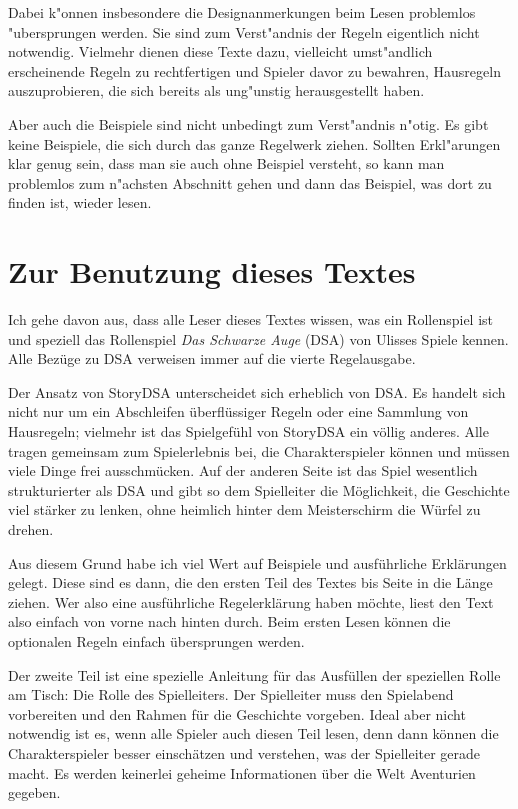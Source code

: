 Dabei k"onnen insbesondere die Designanmerkungen beim Lesen problemlos "ubersprungen werden. Sie sind zum Verst"andnis der Regeln eigentlich nicht notwendig. Vielmehr dienen diese Texte dazu, vielleicht umst"andlich erscheinende Regeln zu rechtfertigen und Spieler davor zu bewahren, Hausregeln auszuprobieren, die sich bereits als ung"unstig herausgestellt haben.

Aber auch die Beispiele sind nicht unbedingt zum Verst"andnis n"otig. Es gibt keine Beispiele, die sich durch das ganze Regelwerk ziehen. Sollten Erkl"arungen klar genug sein, dass man sie auch ohne Beispiel versteht, so kann man problemlos zum n"achsten Abschnitt gehen und dann das Beispiel, was dort zu finden ist, wieder lesen.


\section{Zur Benutzung dieses Textes}
Ich gehe davon aus, dass alle Leser dieses Textes wissen, was ein Rollenspiel ist und speziell das Rollenspiel \emph{Das Schwarze Auge} (DSA) von Ulisses Spiele kennen. Alle Bezüge zu DSA verweisen immer auf die vierte Regelausgabe.

Der Ansatz von StoryDSA unterscheidet sich erheblich von DSA. Es handelt sich nicht nur um ein Abschleifen überflüssiger Regeln oder eine Sammlung von Hausregeln; vielmehr ist das Spielgefühl von StoryDSA ein völlig anderes. Alle tragen gemeinsam zum Spielerlebnis bei, die Charakterspieler können und müssen viele Dinge frei ausschmücken. Auf der anderen Seite ist das Spiel wesentlich strukturierter als DSA und gibt so dem Spielleiter die Möglichkeit, die Geschichte viel stärker zu lenken, ohne heimlich hinter dem Meisterschirm die Würfel zu drehen.

Aus diesem Grund habe ich viel Wert auf Beispiele und ausführliche Erklärungen gelegt. Diese sind es dann, die den ersten Teil des Textes bis Seite \pageref{EndeSpielregeln} in die Länge ziehen. Wer also eine ausführliche Regelerklärung haben möchte, liest den Text also einfach von vorne nach hinten durch. Beim ersten Lesen können die optionalen Regeln einfach übersprungen werden.

Der zweite Teil ist eine spezielle Anleitung für das Ausfüllen der speziellen Rolle am Tisch: Die Rolle des Spielleiters. Der Spielleiter muss den Spielabend vorbereiten und den Rahmen für die Geschichte vorgeben. Ideal aber nicht notwendig ist es, wenn alle Spieler auch diesen Teil lesen, denn dann können die Charakterspieler besser einschätzen und verstehen, was der Spielleiter gerade macht. Es werden keinerlei geheime Informationen über die Welt Aventurien gegeben.

